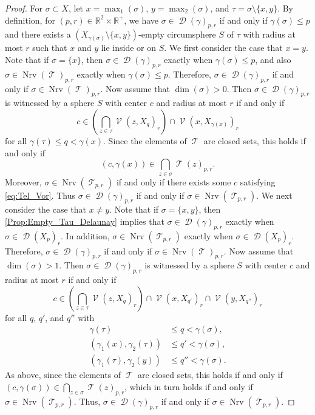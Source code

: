 \documentclass[11pt]{amsart}
\newcommand{\R}{\mathbb{R}} %
\DeclareMathOperator{\Nrv}{Nrv}
\DeclareMathOperator{\V}{\mathcal{V}}
\DeclareMathOperator{\Del}{\mathcal{D}}
\DeclareMathOperator{\TelVor}{\mathcal{T}}
\theoremstyle{plain}
\theoremstyle{definition}
\theoremstyle{remark}
\begin{document}
\begin{proof}
For $\sigma\subset X$, let $x=\max_1(\sigma)$,  $y=\max_{2}(\sigma)$, and $\tau=\sigma\setminus \{x,y\}$.  
By definition, for $(p,r)\in \R^2\times \R^+$, we have $\sigma \in \Del(\gamma)_{p,r}$ if and only if  $\gamma(\sigma)\leq p$ and there exists a $(X_{\gamma(\sigma)}\setminus \{x,y\})$-empty circumsphere $S$ of $\tau$ with radius at most $r$ such that $x$ and $y$ lie inside or on $S$.  
%
We first consider the case that $x=y$.  Note that if $\sigma=\{x\}$, then $\sigma\in \Del(\gamma)_{p,r}$ exactly when $\gamma(\sigma)\leq p$, and also $\sigma\in \Nrv(\TelVor)_{p,r}$ exactly when $\gamma(\sigma)\leq p$.  Therefore, $\sigma\in  \Del(\gamma)_{p,r}$ if and only if  $\sigma\in \Nrv(\TelVor)_{p,r}$.  Now assume that  $\dim(\sigma)>0$.  Then $\sigma \in \Del(\gamma)_{p,r}$ is witnessed by a sphere $S$ with center $c$ and radius at most $r$ if and only if 
\[c\in \left(\bigcap_{z\in \tau} \V(z,X_{q})_r\right)\cap \V(x,X_{\gamma(x)})_r\]
for all $\gamma(\tau) \leq q< \gamma(x)$.  Since the elements of $\TelVor$ are closed sets, this holds if and only if 
\begin{equation}\label{eq:Tel_Vor}
(c,\gamma(x))\in \bigcap_{z\in \sigma} \TelVor(z)_{p,r}.
\end{equation}
 Moreover, $\sigma\in \Nrv(\TelVor_{p,r})$ if and only if there exists some $c$ satisfying \eqref{eq:Tel_Vor}.  Thus $\sigma\in  \Del(\gamma)_{p,r}$ if and only if $\sigma\in \Nrv(\TelVor_{p,r})$.
%
We next consider the case that $x\ne y$.  Note that if $\sigma=\{x,y\}$, then \cref{Prop:Empty_Tau_Delaunay} implies that $\sigma\in \Del(\gamma)_{p,r}$ exactly when $\sigma\in \Del(X_{p})_r$.  In addition, $\sigma\in \Nrv(\TelVor_{p,r})$ exactly when $\sigma\in \Del(X_{p})_r$.   Therefore, $\sigma\in  \Del(\gamma)_{p,r}$ if and only if  $\sigma\in \Nrv(\TelVor)_{p,r}$.  Now assume that  $\dim(\sigma)>1$.  Then $\sigma \in \Del(\gamma)_{p,r}$ is witnessed by a sphere $S$ with center $c$ and radius at most $r$ if and only if 
\[c\in \left(\bigcap_{z\in \tau} \V(z,X_{q})_r\right)\cap \V(x,X_{q'})_r \cap  \V(y,X_{q''})_r\]
for all $q$, $q'$, and $q''$ with 
\begin{align*}
\gamma(\tau) &\leq q< \gamma(\sigma),\\
(\gamma_1(x),\gamma_2(\tau))&\leq q'< \gamma(\sigma),\\
(\gamma_1(\tau),\gamma_2(y))&\leq q''< \gamma(\sigma).
\end{align*}
As above, since the elements of $\TelVor$ are closed sets, this holds if and only if $(c,\gamma(\sigma))\in \bigcap_{z\in \sigma} \TelVor(z)_{p,r}$, which in turn holds if and only if $\sigma \in  \Nrv(\TelVor_{p,r})$.  Thus, $\sigma\in  \Del(\gamma)_{p,r}$ if and only if $\sigma\in \Nrv(\TelVor_{p,r})$.
\end{proof}
\end{document}
